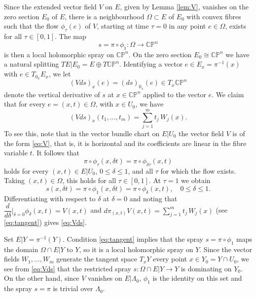 \documentclass[12pt]{amsart}
\theoremstyle{definition}
\numberwithin{equation}{section}
\numberwithin{figure}{section}
\newcommand\CP{\mathbb{CP}}
\numberwithin{equation}{section}
\begin{document}
Since the extended vector field $V$ on $E$, given by Lemma \ref{lem:V}, 
vanishes on the zero section $E_0$ of $E$, 
there is a neighbourhood $\Omega \subset E$ of $E_0$ with convex fibres
such that the flow $\phi_\tau(e)$ of $V$, starting at time $\tau=0$ in 
any point $e\in \Omega$, exists for all $\tau \in [0,1]$. The map 
\[
	s=\pi\circ \phi_1:\Omega \to \CP^n
\]
is then a local holomorphic spray on $\CP^n$.
On the zero section $E_0\cong \CP^n$ we have 
a natural splitting $TE|E_0=E \oplus T\CP^n$.
Identifying a vector $e\in E_x=\pi^{-1}(x)$ with $e\in T_{0_x} E_x$, we let 
\[
	(V\!ds)_{x}(e)=(ds)_{0_x}(e)\in T_x \CP^n
\]
denote the vertical derivative of $s$ at $x\in \CP^n$ applied to the vector $e$.
We claim that for every $e=(x,t) \in \Omega$, with $x\in U_0$, we have 
\begin{equation}\label{eq:Vds}
	(V\!ds)_{x}(t_1,\ldots,t_m)= \sum_{j=1}^m t_j\, W_j(x).
\end{equation}
To see this, note that in the vector bundle chart on $E|U_0$ the 
vector field $V$ is of the form \eqref{eq:V},
that is, it is horizontal and its coefficients are linear in the fibre variable $t$.
It follows that 
\begin{equation}\label{eq:linear}
	\pi\circ \phi_\tau(x, \delta t) = \pi\circ \phi_{\delta \tau}(x,t)
\end{equation}
holds for every $(x,t)\in E|U_0$, $0\le \delta \le 1$, and all $\tau$ for which 
the flow exists. Taking $(x,t) \in \Omega$, this holds for all $\tau\in [0,1]$.
At $\tau=1$ we obtain 
\[
	s(x,\delta t) = \pi \circ \phi_1(x,\delta t) = 
	\pi \circ \phi_\delta(x,t),
	\quad 0\le \delta\le 1. 
\]
Differentiating with respect to $\delta$ at $\delta=0$ and noting that 
$\dfrac{d}{d\delta}\Big|_{\delta =0}\phi_\delta(x,t) = V(x,t)$
and $d\pi_{(x,t)} V(x,t) = \sum_{j=1}^m t_j\, W_j(x)$ (see \eqref{eq:tangent})
gives \eqref{eq:Vds}.

Set $E|Y=\pi^{-1}(Y)$. Condition \eqref{eq:tangent} implies that the spray
$s=\pi\circ \phi_1$ maps the domain $\Omega \cap E|Y$ to $Y$, 
so it is a local holomorphic spray on $Y$. Since the vector fields 
$W_1,\ldots,W_m$ generate the tangent space $T_x Y$ every point 
$x\in Y_0 = Y\cap U_0$, we see from \eqref{eq:Vds} that 
the restricted spray $s:\Omega \cap E|Y\to Y$ is dominating on $Y_0$.
On the other hand, since $V$ vanishes on $E|\Lambda_0$, 
$\phi_1$ is the identity on this set and the 
spray $s=\pi$ is trivial over $\Lambda_0$.
\end{document}
